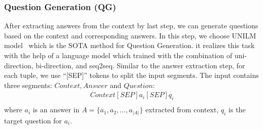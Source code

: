 \subsubsection{Question Generation (QG)}
After extracting answers from the context by last step, we can generate questions based on the context and corresponding answers.
In this step, we choose UNILM model~\cite{dong2019unified} which is the SOTA method for Question Generation.
it realizes this task with the help of a language model which trained with the combination of uni-direction, bi-direction, and seq2seq.
Similar to the answer extraction step, for each tuple, 
we use ``[SEP]'' tokens to split the input segments.
The input contains three segments: $Context, Answer$ and $Question$:
\begin{equation*}
\begin{aligned}
{Context [SEP] a_i [SEP] q_i}\\
\end{aligned}
\end{equation*}
where $a_i$ is an answer in $A=\{a_1, a_2,...,a_{|A|}\}$ extracted from context, $q_i$ is the target question for $a_i$. 
